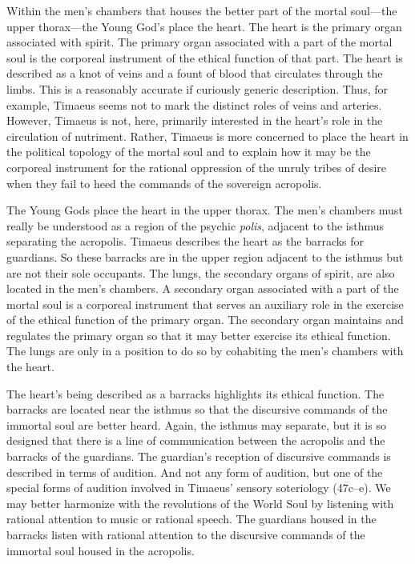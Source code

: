 Within the men's chambers that houses the better part of the mortal soul---the upper thorax---the Young God's place the heart. The heart is the primary organ associated with spirit. The primary organ associated with a part of the mortal soul is the corporeal instrument of the ethical function of that part. The heart is described as a knot of veins and a fount of blood that circulates through the limbs. This is a reasonably accurate if curiously generic description. Thus, for example, Timaeus seems not to mark the distinct roles of veins and arteries. However, Timaeus is not, here, primarily interested in the heart's role in the circulation of nutriment. Rather, Timaeus is more concerned to place the heart in the political topology of the mortal soul and to explain how it may be the corporeal instrument for the rational oppression of the unruly tribes of desire when they fail to heed the commands of the sovereign acropolis.

The Young Gods place the heart in the upper thorax. The men's chambers must really be understood as a region of the psychic \emph{polis}, adjacent to the isthmus separating the acropolis. Timaeus describes the heart as the barracks for guardians. So these barracks are in the upper region adjacent to the isthmus but are not their sole occupants. The lungs, the secondary organs of spirit, are also located in the men's chambers. A secondary organ associated with a part of the mortal soul is a corporeal instrument that serves an auxiliary role in the exercise of the ethical function of the primary organ. The secondary organ maintains and regulates the primary organ so that it may better exercise its ethical function. The lungs are only in a position to do so by cohabiting the men's chambers with the heart.

The heart's being described as a barracks highlights its ethical function. The barracks are located near the isthmus so that the discursive commands of the immortal soul are better heard. Again, the isthmus may separate, but it is so designed that there is a line of communication between the acropolis and the barracks of the guardians. The guardian's reception of discursive commands is described in terms of audition. And not any form of audition, but one of the special forms of audition involved in Timaeus' sensory soteriology (47c--e). We may better harmonize with the revolutions of the World Soul by listening with rational attention to music or rational speech. The guardians housed in the barracks listen with rational attention to the discursive commands of the immortal soul housed in the acropolis.

